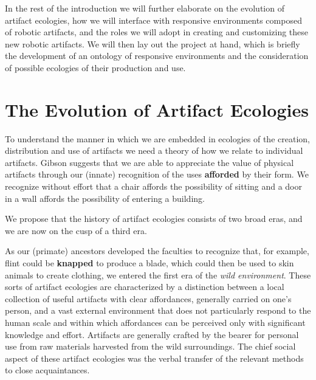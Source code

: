 In the rest of the introduction we will further elaborate on the evolution of artifact ecologies, how we will interface with responsive environments composed of robotic artifacts, and the roles we will adopt in creating and customizing these new robotic artifacts.
We will then lay out the project at hand, which is briefly the development of an ontology of responsive environments and the consideration of possible ecologies of their production and use.

\section{The Evolution of Artifact Ecologies}
%
To understand the manner in which we are embedded in ecologies of the creation, distribution and use of artifacts we need a theory of how we relate to individual artifacts.
Gibson \citeyearpar{gibson_1979} suggests that we are able to appreciate the value of physical artifacts through our (innate) recognition of the uses \textbf{afforded} by their form.
We recognize without effort that a chair affords the possibility of sitting and a door in a wall affords the possibility of entering a building. 

We propose that the history of artifact ecologies consists of two broad eras, and we are now on the cusp of a third era.

As our (primate) ancestors developed the faculties to recognize that, for example, flint could be \textbf{knapped} to produce a blade, which could then be used to skin animals to create clothing, we entered the first era of the \emph{wild environment}. 
These sorts of artifact ecologies are characterized by a distinction between a local collection of useful artifacts with clear affordances, generally carried on one's person, and a vast external environment that does not particularly respond to the human scale and within which affordances can be perceived only with significant knowledge and effort.
Artifacts are generally crafted by the bearer for personal use from raw materials harvested from the wild surroundings. 
The chief social aspect of these artifact ecologies was the verbal transfer of the relevant methods to close acquaintances.

